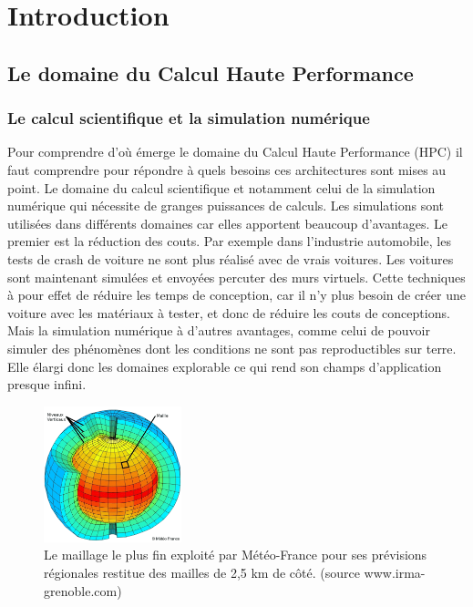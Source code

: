 \chapter{Introduction}
\label{chap:intro}
\minitoc


 
 
 \section{Le domaine du Calcul Haute Performance} 
 


 \subsection{Le calcul scientifique et la simulation numérique}

Pour comprendre d'où émerge le domaine du Calcul Haute Performance (HPC) il faut comprendre pour répondre à quels besoins ces architectures sont mises au point. 
Le domaine du calcul scientifique et notamment celui de la simulation numérique qui nécessite de granges puissances de calculs. Les simulations sont utilisées dans différents domaines car elles apportent beaucoup d'avantages. Le premier est la réduction des couts. Par exemple dans l'industrie automobile, les tests de crash de voiture ne sont plus réalisé avec de vrais voitures. Les voitures sont maintenant simulées et envoyées percuter des murs virtuels. Cette techniques à pour effet de réduire les temps de conception, car il n'y plus besoin de créer une voiture avec les matériaux à tester, et donc de réduire les couts de conceptions. Mais la simulation numérique à d'autres avantages, comme celui de pouvoir simuler des phénomènes dont les conditions ne sont pas reproductibles sur terre. Elle élargi donc les domaines explorable ce qui rend son champs d'application presque infini. 

\begin{figure}[H]
    \center
    \includegraphics[width=4cm]{images/Chapitre1/maillage.png}
    \caption{\label{maillage} Le maillage le plus fin exploité par Météo-France pour ses prévisions régionales restitue des mailles de 2,5 km de côté. (source www.irma-grenoble.com)}
\end{figure}



